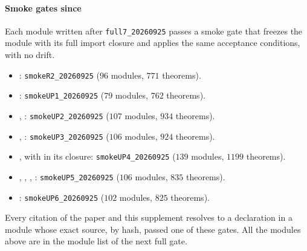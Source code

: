 \paragraph{Smoke gates since} Each module written after \texttt{full7\_20260925} passes a smoke
gate that freezes the module with its full import closure and applies the same acceptance
conditions, with no drift.
\begin{itemize}
\item {}: \texttt{smokeR2\_20260925} ($96$ modules, $771$ theorems).
\item {}: \texttt{smokeUP1\_20260925} ($79$ modules, $762$ theorems).
\item {}, : \texttt{smokeUP2\_20260925}
($107$ modules, $934$ theorems).
\item {}, : \texttt{smokeUP3\_20260925}
($106$ modules, $924$ theorems).
\item {}, with  in its closure:
\texttt{smokeUP4\_20260925} ($139$ modules, $1199$ theorems).
\item {}, , ,
: \texttt{smokeUP5\_20260925} ($106$ modules, $835$ theorems).
\item {}: \texttt{smokeUP6\_20260925} ($102$ modules, $825$ theorems).
\end{itemize}
Every citation of the paper and this supplement resolves to a declaration in a module whose
exact source, by hash, passed one of these gates. All the modules above are in the module list of
the next full gate.


